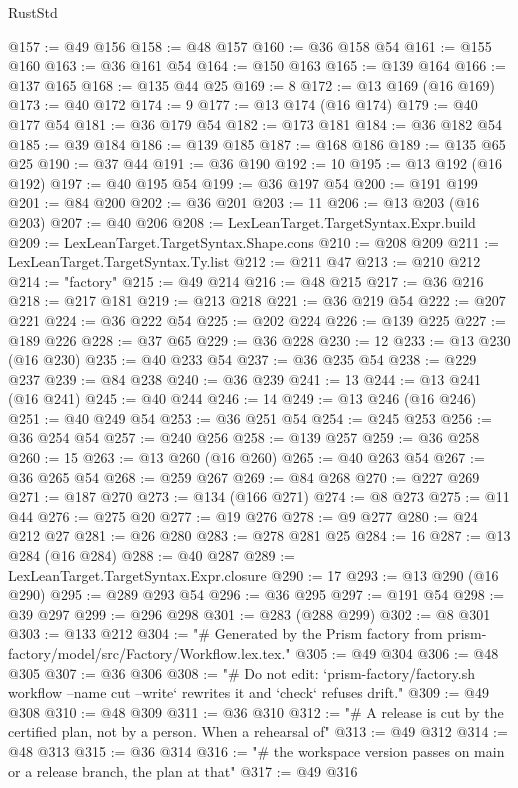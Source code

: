 \begin{lexlean}{RustStd}
\begin{coremodule}
@157 := @49 @156
@158 := @48 @157
@160 := @36 @158 @54
@161 := @155 @160
@163 := @36 @161 @54
@164 := @150 @163
@165 := @139 @164
@166 := @137 @165
@168 := @135 @44 @25
@169 := 8
@172 := @13 @169 (@16 @169)
@173 := @40 @172
@174 := 9
@177 := @13 @174 (@16 @174)
@179 := @40 @177 @54
@181 := @36 @179 @54
@182 := @173 @181
@184 := @36 @182 @54
@185 := @39 @184
@186 := @139 @185
@187 := @168 @186
@189 := @135 @65 @25
@190 := @37 @44
@191 := @36 @190
@192 := 10
@195 := @13 @192 (@16 @192)
@197 := @40 @195 @54
@199 := @36 @197 @54
@200 := @191 @199
@201 := @84 @200
@202 := @36 @201
@203 := 11
@206 := @13 @203 (@16 @203)
@207 := @40 @206
@208 := LexLeanTarget.TargetSyntax.Expr.build
@209 := LexLeanTarget.TargetSyntax.Shape.cons
@210 := @208 @209
@211 := LexLeanTarget.TargetSyntax.Ty.list
@212 := @211 @47
@213 := @210 @212
@214 := "factory"
@215 := @49 @214
@216 := @48 @215
@217 := @36 @216
@218 := @217 @181
@219 := @213 @218
@221 := @36 @219 @54
@222 := @207 @221
@224 := @36 @222 @54
@225 := @202 @224
@226 := @139 @225
@227 := @189 @226
@228 := @37 @65
@229 := @36 @228
@230 := 12
@233 := @13 @230 (@16 @230)
@235 := @40 @233 @54
@237 := @36 @235 @54
@238 := @229 @237
@239 := @84 @238
@240 := @36 @239
@241 := 13
@244 := @13 @241 (@16 @241)
@245 := @40 @244
@246 := 14
@249 := @13 @246 (@16 @246)
@251 := @40 @249 @54
@253 := @36 @251 @54
@254 := @245 @253
@256 := @36 @254 @54
@257 := @240 @256
@258 := @139 @257
@259 := @36 @258
@260 := 15
@263 := @13 @260 (@16 @260)
@265 := @40 @263 @54
@267 := @36 @265 @54
@268 := @259 @267
@269 := @84 @268
@270 := @227 @269
@271 := @187 @270
@273 := @134 (@166 @271)
@274 := @8 @273
@275 := @11 @44
@276 := @275 @20
@277 := @19 @276
@278 := @9 @277
@280 := @24 @212 @27
@281 := @26 @280
@283 := @278 @281 @25
@284 := 16
@287 := @13 @284 (@16 @284)
@288 := @40 @287
@289 := LexLeanTarget.TargetSyntax.Expr.closure
@290 := 17
@293 := @13 @290 (@16 @290)
@295 := @289 @293 @54
@296 := @36 @295
@297 := @191 @54
@298 := @39 @297
@299 := @296 @298
@301 := @283 (@288 @299)
@302 := @8 @301
@303 := @133 @212
@304 := "# Generated by the Prism factory from prism-factory/model/src/Factory/Workflow.lex.tex."
@305 := @49 @304
@306 := @48 @305
@307 := @36 @306
@308 := "# Do not edit: `prism-factory/factory.sh workflow --name cut --write` rewrites it and `check` refuses drift."
@309 := @49 @308
@310 := @48 @309
@311 := @36 @310
@312 := "# A release is cut by the certified plan, not by a person. When a rehearsal of"
@313 := @49 @312
@314 := @48 @313
@315 := @36 @314
@316 := "# the workspace version passes on main or a release branch, the plan at that"
@317 := @49 @316

\end{coremodule}
\end{lexlean}
